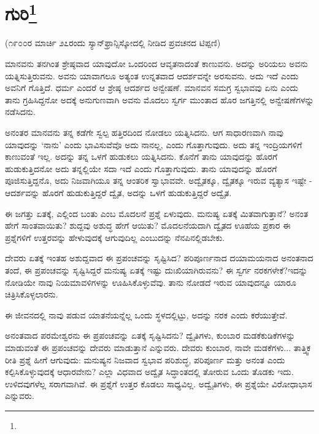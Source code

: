 
\chapter[ಗುರಿ]{ಗುರಿ\protect\footnote{}}

\begin{center}
(೧೯೦೦ರ ಮಾರ್ಚಿ ೨೭ರಂದು ಸ್ಯಾನ್‌ಫ್ರಾನ್ಸಿಸ್ಕೋದಲ್ಲಿ ನೀಡಿದ ಪ್ರವಚನದ ಟಿಪ್ಪಣಿ)
\end{center}

ಮಾನವನು ತನಗಿಂತ ಶ್ರೇಷ್ಠವಾದ ಯಾವುದೋ ಒಂದರಿಂದ ಆವೃತನಾದಂತೆ ಕಾಣುವನು. ಅದನ್ನು ಅರಿಯಲು ಅವನು ಯತ್ನಿಸುತ್ತಿರುವನು. ಅವನು ಯಾವಾಗಲೂ ಅತ್ಯಂತ ಉನ್ನತವಾದ ಆದರ್ಶವನ್ನೇ ಅರಸುವನು. ಅದು ಇದೆ ಎಂದು ಅವನಿಗೆ ಗೊತ್ತಿದೆ. ಧರ್ಮ ಎಂದರೆ ಆ ಶ್ರೇಷ್ಠ ಆದರ್ಶದ ಅನ್ವೇಷಣೆ. ಮಾನವನ ಸಮಗ್ರ ಸ್ವಭಾವವು ಏನು ಎಂದು ತಾನು ಗ್ರಹಿಸಿದ್ದನೋ ಅದಕ್ಕೆ ಅನುಗುಣವಾಗಿ ಅವನು ಮೊದಲು ಸ್ವರ್ಗ ಮುಂತಾದ ಹೊರ ಜಗತ್ತಿನಲ್ಲಿ ಅನ್ವೇಷಣೆಗಳನ್ನು ನಡೆಸಿದನು.

ಅನಂತರ ಮಾನವನು ತನ್ನ ಕಡೆಗೇ ಸ್ವಲ್ಪ ಹತ್ತಿರದಿಂದ ನೋಡಲು ಯತ್ನಿಸಿದನು. ಆಗ ಸಾಧಾರಣವಾಗಿ ನಾವು ಯಾವುದನ್ನು `ನಾನು' ಎಂದು ಭಾವಿಸುವೆವೊ ಅದು ನಾನಲ್ಲ, ಎಂದು ಗೊತ್ತಾಗುವುದು. ಅದು ತನ್ನ ಇಂದ್ರಿಯಗಳಿಗೆ ಕಾಣುವಂತೆ ಇಲ್ಲ. ಅದನ್ನು ತನ್ನ ಒಳಗೆ ಹುಡುಕಲು ಯತ್ನಿಸಿದನು. ಕೊನೆಗೆ ತಾನು ಯಾವುದನ್ನು ಹೊರಗೆ ಹುಡುಕುತ್ತಿದನೋ ಅದು ತನ್ನಲ್ಲಿಯೇ ಸದಾ ಇದೆ ಎಂದು ಗೊತ್ತಾಗುವುದು. ತಾನು ಯಾವುದನ್ನು ಹೊರಗೆ ಪೂಜಿಸುತ್ತಿದ್ದನೊ, ಅದು ನಿಜವಾಗಿಯೂ ತನ್ನ ಆಂತರಿಕ ಸ್ವಾಭಾವವೇ. ಅದ್ವೈತಕ್ಕೂ, ದ್ವೈತಕ್ಕೂ ಇರುವ ವ್ಯತ್ಯಾಸ ಇಷ್ಟೇ - ಆದರ್ಶವನ್ನು ಹೊರಗೆ ಹುಡುಕುತ್ತಿದ್ದರೆ ದ್ವೈತ, ಅದನ್ನು ಒಳಗೆ ಹುಡುಕುತ್ತಿದ್ದರೆ ಅದ್ವೈತ.

ಈ ಜಗತ್ತು ಏತಕ್ಕೆ, ಎಲ್ಲಿಂದ ಬಂತು ಎಂಬ ಮೊದಲನೆ ಪ್ರಶ್ನೆ ಏಳುವುದು. ಮನುಷ್ಯ ಏತಕ್ಕೆ ಮಿತವಾಗುತ್ತಾನೆ? ಅನಂತ ಹೇಗೆ ಸಾಂತವಾಯಿತು? ಶುದ್ದವು ಅಶುದ್ಧ ಹೇಗೆ ಆಯಿತು? ಮೊದಲನೆಯದಾಗಿ ದ್ವೈತದ ಊಹೆಯ ಪ್ರಕಾರ ಈ ಪ್ರಶ್ನೆಗಳಿಗೆ ಉತ್ತರವನ್ನು ಹೇಳುವುದಕ್ಕೆ ಆಗುವುದಿಲ್ಲ ಎಂಬುದನ್ನು ನೆನಪಿನಲ್ಲಿಡಬೇಕು.

ದೇವರು ಏತಕ್ಕೆ ಇಂತಹ ಅಶುದ್ದವಾದ ಈ ಪ್ರಪಂಚವನ್ನು ಸೃಷ್ಟಿಸಿದ? ಪರಿಪೂರ್ಣನಾದ ದಯಾಮಯನಾದ ಅನಂತನಾದ ತಂದೆ, ಈ ಪ್ರಪಂಚವನ್ನು ಸೃಷ್ಟಿಸಿದ್ದರೆ ಮನುಷ್ಯ ಏತಕ್ಕೆ ಇಷ್ಟು ದುಃಖಿಯಾಗಿರುವನು? ಈ ಸ್ವರ್ಗ ನರಕಗಳೇಕೆ?ಇದನ್ನು ನೋಡಿಯೇ ನಾವು ನಿಯಮಾವಳಿಗಳನ್ನು ಊಹಿಸಿಕೊಳ್ಳುವೆವು. ತಾನು ನೋಡದೆ ಇರುವ ಯಾವುದನ್ನೂ ಯಾರೂ ಚಿತ್ರಿಸಿಕೊಳ್ಳಲಾರನು.

ಈ ಜೀವನದಲ್ಲಿ ನಾವು ಪಡುವ ಯಾತನೆಯನ್ನೆಲ್ಲ ಒಂದು ಸ್ಥಳದಲ್ಲಿಟ್ಟು, ಅದನ್ನು ನರಕ ಎಂದು ಕರೆಯುತ್ತೇವೆ.

ಅನಂತವಾದ ಪರಮೇಶ್ವರನು ಈ ಪ್ರಪಂಚವನ್ನು ಏತಕ್ಕೆ ಸೃಷ್ಟಿಸಿದನು? ದ್ವೈತಿಗಳು, ಕುಂಬಾರ ಮಡಕೆಕುಡಿಕೆಗಳನ್ನು ಮಾಡುವಂತೆ ಈ ಪ್ರಪಂಚವನ್ನು ದೇವರು ಮಾಡುತ್ತಾನೆ ಎನ್ನುವರು. ದೇವರು ಕುಂಬಾರ, ನಾವೇ ಮಡಕೆಗಳು... ತಾತ್ತ್ವಿಕ ರೀತಿ ಪ್ರಶ್ನೆ ಹೀಗೆ ಆಗುವುದು: ಮನುಷ್ಯನ ನಿಜವಾದ ಸ್ವಭಾವ ಪರಿಶುದ್ಧ, ಪರಿಪೂರ್ಣ ಮತ್ತು ಅನಂತ ಎಂದು ಕಲ್ಪಿಸಿಕೊಳ್ಳುವುದಕ್ಕೆ ಆಧಾರವೇನು? ಎಲ್ಲಾ ವಿಧವಾದ ಅದ್ವೈತ ಸಿದ್ಧಾಂತದಲ್ಲಿ ತೋರುವ ಒಂದು ತೊಡಕು ಇದು. ಉಳಿದವುಗಳೆಲ್ಲ ಸರಾಗವಾಗಿವೆ. ಈ ಪ್ರಶ್ನೆಗೆ ಉತ್ತರ ಕೊಡಲು ಸಾಧ್ಯವಿಲ್ಲ. ಅದ್ವೈತಿಗಳು, ಈ ಪ್ರಶ್ನೆಯೇ ವಿರೋಧಾಭಾಸ ಎನ್ನುವರು.

